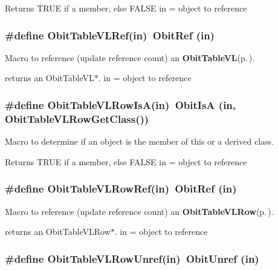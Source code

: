 Returns TRUE if a member, else FALSE in = object to reference 
\subsubsection{\setlength{\rightskip}{0pt plus 5cm}\#define Obit\-Table\-VLRef(in)\ Obit\-Ref (in)}\label{ObitTableVL_8h_a2}


Macro to reference (update reference count) an {\bf Obit\-Table\-VL}{\rm (p.\,\pageref{structObitTableVL})}. 

returns an Obit\-Table\-VL$\ast$. in = object to reference 
\subsubsection{\setlength{\rightskip}{0pt plus 5cm}\#define Obit\-Table\-VLRow\-Is\-A(in)\ Obit\-Is\-A (in, Obit\-Table\-VLRow\-Get\-Class())}\label{ObitTableVL_8h_a6}


Macro to determine if an object is the member of this or a derived class. 

Returns TRUE if a member, else FALSE in = object to reference 
\subsubsection{\setlength{\rightskip}{0pt plus 5cm}\#define Obit\-Table\-VLRow\-Ref(in)\ Obit\-Ref (in)}\label{ObitTableVL_8h_a5}


Macro to reference (update reference count) an {\bf Obit\-Table\-VLRow}{\rm (p.\,\pageref{structObitTableVLRow})}. 

returns an Obit\-Table\-VLRow$\ast$. in = object to reference 
\subsubsection{\setlength{\rightskip}{0pt plus 5cm}\#define Obit\-Table\-VLRow\-Unref(in)\ Obit\-Unref (in)}\label{ObitTableVL_8h_a4}



